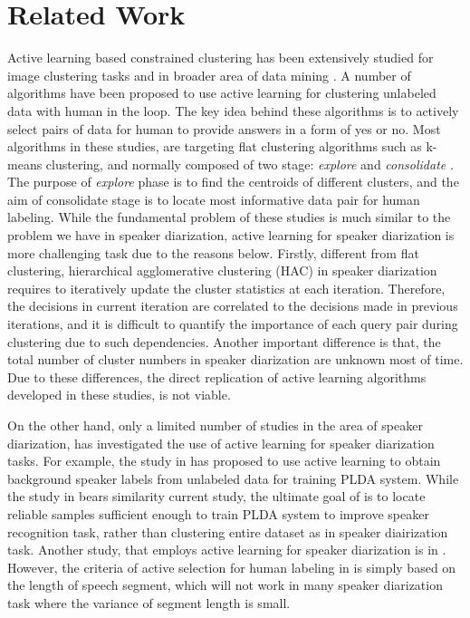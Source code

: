 \documentclass[journal,10pt]{IEEEtran}
\begin{document}
\section{Related Work}
\label{rw}
Active learning based constrained clustering has been extensively studied for image clustering tasks \cite{guo2007optimistic, vijayanarasimhan2010far,biswas2014active} and in broader area of data mining \cite{basu2004active, mallapragada2008active}. A number of algorithms have been proposed to use active learning for clustering unlabeled data with human in the loop. The key idea behind these algorithms is to actively select pairs of data for human to provide answers in a form of yes or no. 
Most algorithms in these studies, are targeting flat clustering algorithms such as k-means clustering, and normally composed of two stage: \textit{explore} and \textit{consolidate} \cite{basu2004active, mallapragada2008active}. The purpose of \textit{explore} phase is to find the centroids of different clusters, and the aim of consolidate stage is to locate most informative data pair for human labeling. While the fundamental problem of these studies is much similar to the problem we have in speaker diarization, active learning for speaker diarization is more challenging task due to the reasons below. Firstly, different from flat clustering, hierarchical agglomerative clustering (HAC) in speaker diarization requires to iteratively update the cluster statistics at each iteration. Therefore, the decisions in current iteration are correlated to the decisions made in previous iterations, and it is difficult to quantify the importance of each query pair during clustering due to such dependencies. Another important difference is that, the total number of cluster numbers in speaker diarization are unknown most of time. Due to these differences, the direct replication of active learning algorithms developed in these studies, is not viable.

On the other hand, only a limited number of studies in the area of speaker diarization, has investigated the use of active learning for speaker diarization tasks. For example, the study in \cite{shum2014limited} has proposed to use active learning to obtain background speaker labels from unlabeled data for training PLDA system. While the study in \cite{shum2014limited} bears similarity current study, the ultimate goal of \cite{shum2014limited} is to locate reliable samples sufficient enough to train PLDA system to improve speaker recognition task, rather than clustering entire dataset as in speaker diairization task. Another study, that employs active learning for speaker diarization is in \cite{mateusz2014active}. However, the criteria of active selection for human labeling in \cite{mateusz2014active} is simply based on the length of speech segment, which will not work in many speaker diarization task where the variance of segment length is small.
\end{document}
